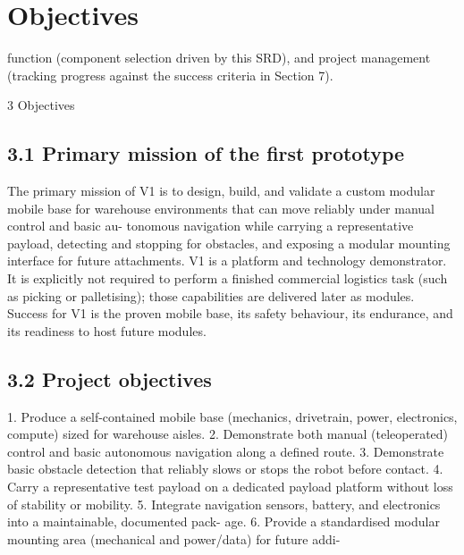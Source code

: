 \chapter{Objectives}

function (component selection driven by this SRD), and project management (tracking progress against the success criteria in Section 7).

3 Objectives

\section*{3.1 Primary mission of the first prototype}

The primary mission of V1 is to design, build, and validate a custom modular mobile base for warehouse environments that can move reliably under manual control and basic au- tonomous navigation while carrying a representative payload, detecting and stopping for obstacles, and exposing a modular mounting interface for future attachments. V1 is a platform and technology demonstrator. It is explicitly not required to perform a finished commercial logistics task (such as picking or palletising); those capabilities are delivered later as modules. Success for V1 is the proven mobile base, its safety behaviour, its endurance, and its readiness to host future modules.

\section*{3.2 Project objectives}

1. Produce a self-contained mobile base (mechanics, drivetrain, power, electronics, compute) sized for warehouse aisles. 2. Demonstrate both manual (teleoperated) control and basic autonomous navigation along a defined route. 3. Demonstrate basic obstacle detection that reliably slows or stops the robot before contact. 4. Carry a representative test payload on a dedicated payload platform without loss of stability or mobility. 5. Integrate navigation sensors, battery, and electronics into a maintainable, documented pack- age. 6. Provide a standardised modular mounting area (mechanical and power/data) for future addi-

